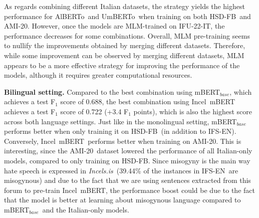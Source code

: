 \documentclass[11pt]{article}
\newcommand{\dsITcorpus}{IFU-22-IT}
\newcommand{\dsENclassification}{IFS-EN}
\newcommand{\mbert}{\mbox{mBERT$_{base}$}}
\newcommand{\imbert}{\mbox{Incel mBERT}}
\newcommand{\umbert}{\mbox{UmBERTo}}
\newcommand{\albert}{\mbox{AlBERTo}}
\newcommand{\iumbert}{\mbox{Incel UmBERTo}}
\newcommand{\ialbert}{\mbox{Incel AlBERTo}}
\newcommand{\hsdfb}{\mbox{HSD-FB}}
\newcommand{\hsdtw}{\mbox{HSD-TW}}
\newcommand{\ami}{\mbox{AMI-20}}
\newcommand{\enforum}{\textit{Incels.is}}
\begin{document}
As regards combining different Italian datasets, the strategy yields the highest performance for \albert\, and \umbert\, when training on both \hsdfb\, and \ami.
However, once the models are MLM-trained on \dsITcorpus, the performance decreases for some combinations. Overall, MLM pre-training seems to nullify the improvements obtained by merging different datasets. Therefore, while some improvement can be observed by merging different datasets, MLM appears to be a more effective strategy for improving the performance of the models, although it requires greater computational resources.

\vspace*{1mm}
\noindent\textbf{Bilingual setting.}
Compared to the best combination using \mbert, which achieves a test F$_1$ score of 0.688, the best combination using \imbert\, achieves a test F$_1$ score of 0.722 (+3.4 F$_1$ points), which is also the highest score across both language settings. Just like in the monolingual setting, \mbert\, performs better when only training it on \hsdfb\, (in addition to \dsENclassification). Conversely, \imbert\, performs better when training on \ami. This is interesting, since the \ami\, dataset lowered the performance of all Italian-only models, compared to only training on \hsdfb. Since misogyny is the main way hate speech is expressed in \enforum\, (39.44\% of the instances in \dsENclassification\, are misogynous) and due to the fact that we are using sentences extracted from this forum to pre-train \imbert, the performance boost could be due to the fact that the model is better at learning about misogynous language compared to \mbert\, and the Italian-only models.
\end{document}
